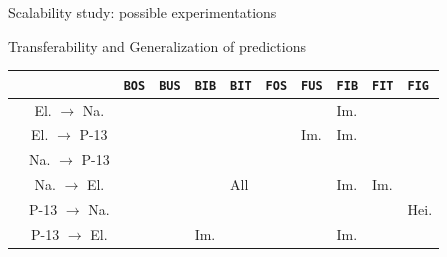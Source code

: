 \documentclass[10pt, export]{beamer}
\begin{document}
        \begin{frame}{Scalability study: possible experimentations}
            \begin{figure}
                
            \end{figure}
        \end{frame}
        \begin{frame}{Transferability and Generalization of predictions}
            \begin{table}
                \scriptsize
                \begin{center}
                    \begin{tabular}{c c| x{.4cm} x{.4cm} x{.4cm} x{.4cm} |x{.4cm} x{.4cm} x{.4cm} x{.55cm} x{.4cm}}
                        \hline
                        &&\texttt{BOS}  & \texttt{BUS} &\texttt{BIB} &\texttt{BIT} &\texttt{FOS}  & \texttt{FUS} &\texttt{FIB} &\texttt{FIT} &\texttt{FIG} \\
                        \hline
                        &El. $\rightarrow$ Na. & & && & & & Im. & &\\
                        &El. $\rightarrow$ P-13  & & & & & & Im.& Im.& &\\
                        &Na. $\rightarrow$ P-13  & & &  & & & & &  &\\
                        &Na. $\rightarrow$ El.  & & & &All & & &Im. &Im. &\\
                        &P-13 $\rightarrow$ Na.  & & &  & & & & &  &  Hei.\\
                        &P-13 $\rightarrow$ El. & & & Im. & & & & Im. &  & \\

\end{tabular}
\end{center}
\end{table}
\end{frame}
\end{document}
